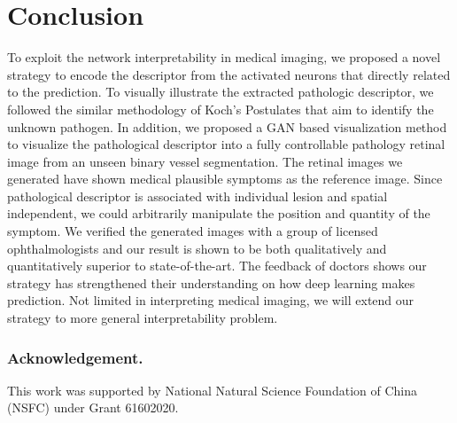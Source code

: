 \documentclass[letterpaper]{article} %
\begin{document}
	\section{Conclusion}
        To exploit the network interpretability in medical imaging, we proposed a novel strategy to encode the descriptor from the activated neurons that directly related to the prediction. To visually illustrate the extracted pathologic descriptor, we followed the similar methodology of Koch's Postulates that aim to identify the unknown pathogen. In addition, we proposed a GAN based visualization method to visualize the pathological descriptor into a fully controllable pathology retinal image from an unseen binary vessel segmentation. The retinal images we generated have shown medical plausible symptoms  as the reference image. Since pathological descriptor is associated with individual lesion and spatial independent, we could arbitrarily manipulate the position and quantity of the symptom. We verified the generated images with  a group of  licensed ophthalmologists and our result is shown to be both qualitatively and quantitatively superior to state-of-the-art.
        The feedback of doctors shows our strategy  has strengthened their understanding on how deep learning makes prediction. Not limited in interpreting medical imaging, we will extend our strategy to more general interpretability problem.












        \subsubsection{Acknowledgement.} This work was supported by National Natural Science Foundation of China (NSFC) under Grant 61602020.









\end{document}
